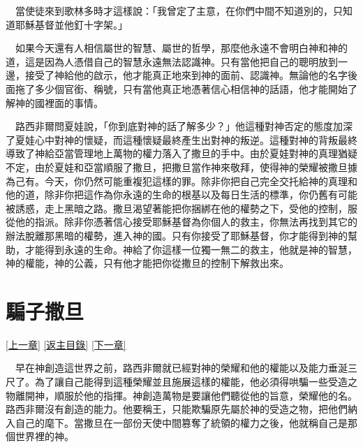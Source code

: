\documentclass{book}
\begin{document}
　當使徒來到歌林多時才這樣說：「我曾定了主意，在你們中間不知道別的，只知道耶穌基督並他釘十字架。」

　如果今天還有人相信屬世的智慧、屬世的哲學，那麼他永遠不會明白神和神的道，這是因為人憑借自己的智慧永遠無法認識神。只有當他把自己的聰明放到一邊，接受了神給他的啟示，他才能真正地來到神的面前、認識神。無論他的名字後面拖了多少個官銜、稱號，只有當他真正地憑著信心相信神的話語，他才能開始了解神的國裡面的事情。

　路西非爾問夏娃說，「你到底對神的話了解多少？」他這種對神否定的態度加深了夏娃心中對神的懷疑，而這種懷疑最終產生出對神的叛逆。這種對神的背叛最終導致了神給亞當管理地上萬物的權力落入了撒旦的手中。由於夏娃對神的真理猶疑不定，由於夏娃和亞當順服了撒旦，把撒旦當作神來敬拜，使得神的榮耀被撒旦據為己有。今天，你仍然可能重複犯這樣的罪。除非你把自己完全交托給神的真理和他的道，除非你把這作為你永遠的生命的根基以及每日生活的標準，你仍舊有可能被誘惑，走上黑暗之路。撒旦渴望著能把你捆綁在他的權勢之下，受他的控制，服從他的指派。除非你憑著信心接受耶穌基督為你個人的救主，你無法再找到其它的辦法脫離那黑暗的權勢，進入神的國。只有你接受了耶穌基督，你才能得到神的幫助，才能得到永遠的生命。神給了你這樣一位獨一無二的救主，他就是神的智慧，神的權能，神的公義，只有他才能把你從撒旦的控制下解救出來。

\chapter{騙子撒旦}
\label{sec:ch05}
\hyperref[sec:ch04]{[上一章]}
\hyperlink{toc}{[返主目錄]}
\hyperref[sec:ch06]{[下一章]}

\begin{center}
\noindent{}
\end{center}

　早在神創造這世界之前，路西非爾就已經對神的榮耀和他的權能以及能力垂涎三尺了。為了讓自己能得到這種榮耀並且施展這樣的權能，他必須得哄騙一些受造之物離開神，順服於他的指揮。神創造萬物是要讓他們聽從他的旨意，榮耀他的名。路西非爾沒有創造的能力。他要稱王，只能欺騙原先屬於神的受造之物，把他們納入自己的麾下。當撒旦在一部份天使中間篡奪了統領的權力之後，他就稱自己是那個世界裡的神。
\end{document}

